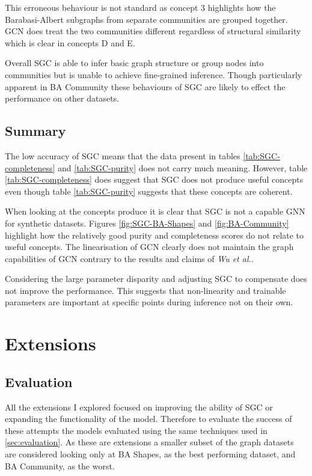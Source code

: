 This erroneous behaviour is not standard as concept 3 highlights how the Barabasi-Albert subgraphs from separate communities are grouped together.
GCN does treat the two communities different regardless of structural similarity which is clear in concepts D and E.

Overall SGC is able to infer basic graph structure or group nodes into communities but is unable to achieve fine-grained inference.
Though particularly apparent in BA Community these behaviours of SGC are likely to effect the performance on other datasets.

\subsection{Summary}
The low accuracy of SGC means that the data present in tables \ref{tab:SGC-completeness} and \ref{tab:SGC-purity} does not carry much meaning.
However, table \ref{tab:SGC-completeness} does suggest that SGC does not produce useful concepts even though table \ref{tab:SGC-purity} suggests that these concepts are coherent.

When looking at the concepts produce it is clear that SGC is not a capable GNN for synthetic datasets.
Figures \ref{fig:SGC-BA-Shapes} and \ref{fig:BA-Community} highlight how the relatively good purity and completeness scores do not relate to useful concepts.
The linearisation of GCN clearly does not maintain the graph capabilities of GCN contrary to the results and claims of \textit{Wu et al.}.

Considering the large parameter disparity and adjusting SGC to compensate does not improve the performance.
This suggests that non-linearity and trainable parameters are important at specific points during inference not on their own.

\section{Extensions}
\label{sec:extension-eval}
\subsection{Evaluation}
All the extensions I explored focused on improving the ability of SGC or expanding the functionality of the model.
Therefore to evaluate the success of these attempts the models evaluated using the same techniques used in \ref{sec:evaluation}.
As these are extensions a smaller subset of the graph datasets are considered looking only at BA Shapes, as the best performing dataset, and BA Community, as the worst.

